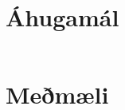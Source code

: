 \documentclass[]{article}
\begin{document}
\section*{Áhugamál}
\begin{table}[h]
	\centering
	\label{my-label}
	\begin{tabular}{|p{7cm}|p{10cm}|}
		\hline
	\end{tabular}
\end{table}

\section*{Meðmæli}
\begin{table}[h]
	\centering
	\label{my-label}
	\begin{tabular}{|p{7cm}|p{10cm}|}
		\hline
		
	\end{tabular}
\end{table}
\end{document}

